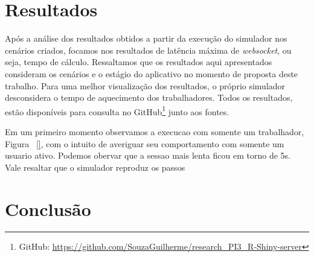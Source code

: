 \documentclass[12pt,english,brazil]{article}
\begin{document}
\section{Resultados} \label{sec:Resultados}
Após a análise dos resultados obtidos a partir da execução do simulador nos cenários criados, focamos nos resultados de latência máxima de \emph{websocket}, ou seja, tempo de cálculo. Ressaltamos que os resultados aqui apresentados consideram os cenários e o estágio do aplicativo no momento de proposta deste trabalho. Para uma melhor visualização dos resultados, o próprio simulador desconsidera o tempo de aquecimento dos trabalhadores. Todos os resultados, estão disponíveis para consulta no GitHub\footnote{GitHub: \url{https://github.com/SouzaGuilherme/research_PI3_R-Shiny-server}} junto aos fontes.

Em um primeiro momento observamos a execucao com somente um trabalhador, Figura ~\ref{}, com o intuito de averiguar seu comportamento com somente um usuario ativo. Podemos obervar que a sessao mais lenta ficou em torno de 5s. Vale resaltar que o simulador reproduz os passos 

\section{Conclusão} \label{sec:conlusao}





\end{document}
